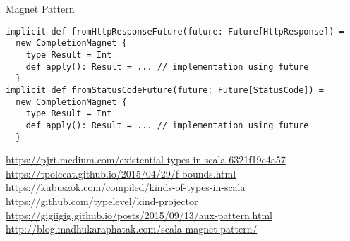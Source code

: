 \documentclass[aspectratio=169]{beamer}
\begin{document}
\begin{frame}[fragile]{Magnet Pattern}
\begin{verbatim}
implicit def fromHttpResponseFuture(future: Future[HttpResponse]) =
  new CompletionMagnet {
    type Result = Int
    def apply(): Result = ... // implementation using future
  }
implicit def fromStatusCodeFuture(future: Future[StatusCode]) =
  new CompletionMagnet {
    type Result = Int
    def apply(): Result = ... // implementation using future
  }
\end{verbatim}
\end{frame}

\begin{thebibliography}{9} 
  \url{https://pjrt.medium.com/existential-types-in-scala-6321f19c4a57}
  \url{https://tpolecat.github.io/2015/04/29/f-bounds.html}
  \url{https://kubuszok.com/compiled/kinds-of-types-in-scala}
  \url{https://github.com/typelevel/kind-projector}
  \url{https://gigiigig.github.io/posts/2015/09/13/aux-pattern.html}
  \url{http://blog.madhukaraphatak.com/scala-magnet-pattern/}
\end{thebibliography}
\end{document}

